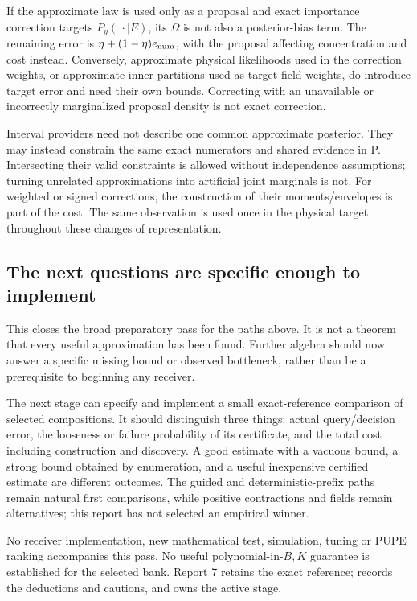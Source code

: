 \documentclass[10pt,a4paper]{article}
\begin{document}
If the approximate law is used only as a proposal and exact importance correction targets
$P_y(\,\cdot\mid E)$, its $\Omega$ is not also a posterior-bias term. The remaining error is
$\eta+(1-\eta)e_{\rm num}$, with the proposal affecting concentration and cost instead.
Conversely, approximate physical likelihoods used in the correction weights, or approximate inner
partitions used as target field weights, do introduce target error and need their own bounds.
Correcting with an unavailable or incorrectly marginalized proposal density is not exact correction.

Interval providers need not describe one common approximate posterior. They may instead constrain the
same exact numerators and shared evidence in P. Intersecting their valid constraints is allowed without
independence assumptions; turning unrelated approximations into artificial joint marginals is not.
For weighted or signed corrections, the construction of their moments/envelopes is part of the cost.
The same observation is used once in the physical target throughout these changes of representation.

\subsection{The next questions are specific enough to implement}
This closes the broad preparatory pass for the paths above. It is not a theorem that every useful
approximation has been found. Further algebra should now answer a specific missing bound or observed
bottleneck, rather than be a prerequisite to beginning any receiver.

The next stage can specify and implement a small exact-reference comparison of selected compositions.
It should distinguish three things: actual query/decision error, the looseness or failure probability
of its certificate, and the total cost including construction and discovery. A good estimate with a
vacuous bound, a strong bound obtained by enumeration, and a useful inexpensive certified estimate are
different outcomes. The guided and deterministic-prefix paths remain natural first comparisons, while
positive contractions and fields remain alternatives; this report has not selected an empirical winner.

No receiver implementation, new mathematical test, simulation, tuning or PUPE ranking accompanies this
pass. No useful polynomial-in-$B,K$ guarantee is established for the selected bank. Report 7 retains the
exact reference;  records the deductions and cautions, and
 owns the active stage.
\end{document}
